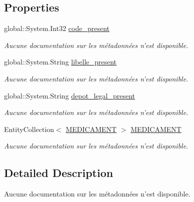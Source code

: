 \subsection*{Properties}
\begin{DoxyCompactItemize}
\item 
global\-::\-System.\-Int32 \hyperlink{class_model_1_1_p_r_e_s_e_n_t_a_t_i_o_n_a97c7cbefa08736b44382aec5dda9adf4}{code\-\_\-present}
\begin{DoxyCompactList}\small\item\em Aucune documentation sur les métadonnées n'est disponible. \end{DoxyCompactList}\item 
global\-::\-System.\-String \hyperlink{class_model_1_1_p_r_e_s_e_n_t_a_t_i_o_n_ae64c2be728fa1e6dbd1a5766e4453d07}{libelle\-\_\-present}
\begin{DoxyCompactList}\small\item\em Aucune documentation sur les métadonnées n'est disponible. \end{DoxyCompactList}\item 
global\-::\-System.\-String \hyperlink{class_model_1_1_p_r_e_s_e_n_t_a_t_i_o_n_a9e2fa4b05a5ce426e1c1cc8ec44b25bc}{depot\-\_\-legal\-\_\-present}
\begin{DoxyCompactList}\small\item\em Aucune documentation sur les métadonnées n'est disponible. \end{DoxyCompactList}\item 
Entity\-Collection$<$ \hyperlink{class_model_1_1_m_e_d_i_c_a_m_e_n_t}{M\-E\-D\-I\-C\-A\-M\-E\-N\-T} $>$ \hyperlink{class_model_1_1_p_r_e_s_e_n_t_a_t_i_o_n_a0b3e3f0cdd8d574cb35b28ee097ab0af}{M\-E\-D\-I\-C\-A\-M\-E\-N\-T}
\begin{DoxyCompactList}\small\item\em Aucune documentation sur les métadonnées n'est disponible. \end{DoxyCompactList}\end{DoxyCompactItemize}


\subsection{Detailed Description}
Aucune documentation sur les métadonnées n'est disponible. 




